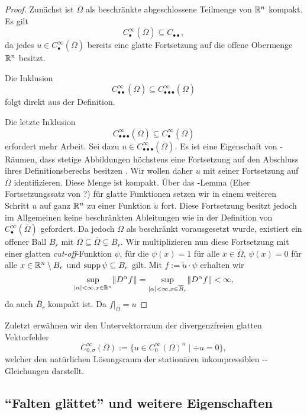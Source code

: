 \begin{proof}
  Zunächst ist $\overline\Omega$ als beschränkte abgeschlossene Teilmenge von $\mathbb{R}^n$ kompakt.
  Es gilt $$C^\infty_\bullet(\overline\Omega) \subseteq C_{\bullet\bullet},$$ da jedes $u\in C^\infty_\bullet(\overline\Omega)$ bereits eine glatte Fortsetzung auf die offene Obermenge $\mathbb{R}^n$ besitzt.

  Die Inklusion $$C^\infty_{\bullet\bullet}(\overline\Omega) \subseteq C^\infty_{\bullet\bullet\bullet}(\overline\Omega)$$ folgt direkt aus der Definition.
  
  Die letzte Inklusion $$C^\infty_{\bullet\bullet\bullet}(\overline\Omega) \subseteq C^\infty_{\bullet}(\overline\Omega)$$ erfordert mehr Arbeit.
  Sei dazu $u \in C^\infty_{\bullet\bullet\bullet}(\overline\Omega)$.
  Es ist eine Eigenschaft von \hausdorff\hyp{}Räumen, dass stetige Abbildungen höchstens eine Fortsetzung auf den Abschluss ihres Definitionsberechs besitzen \cite[S.112, Lemma 4.2.4]{bartsch2015topologie}.
  Wir wollen daher $u$ mit seiner Fortsetzung auf $\overline\Omega$ identifizieren.
  Diese Menge ist kompakt.
  Über das \urysohn\hyp{}Lemma (Eher Fortsetzungssatz von \steiner?) für glatte Funktionen \cite{rochskriptehernicht} setzen wir in einem weiteren Schritt $u$ auf ganz $\mathbb{R}^n$ zu einer Funktion $\tilde u$ fort.
  Diese Fortsetzung besitzt jedoch im Allgemeinen keine beschränkten Ableitungen wie in der Definition von $C^\infty_{\bullet}(\overline\Omega)$ gefordert.
  Da jedoch $\Omega$ als beschränkt vorausgesetzt wurde, existiert ein offener Ball $B_r$ mit $\Omega \subseteq \overline\Omega \subsetneq B_r$. 
  Wir multiplizieren nun diese Fortsetzung mit einer glatten \emph{cut-off}\hyp{}Funktion $\psi$, für die
  $\psi(x) = 1$ für alle $x \in \overline\Omega$, $\psi(x) = 0$ für alle $x \in \mathbb{R}^n \setminus B_r$ und $\operatorname{supp} \psi \subseteq B_r$ gilt.
  Mit $f := \tilde u \cdot \psi$ erhalten wir
  $$
  \sup_{|\alpha| < \infty, x \in \mathbb{R}^n}\lVert  D^\alpha f \rVert
   = \sup_{|\alpha| < \infty, x \in \overline B_r}\lVert  D^\alpha f \rVert
   < \infty,
  $$
  da auch $\overline B_r$ kompakt ist.
  Da $f|_{\overline\Omega} = u$
\end{proof}

Zuletzt erwähnen wir den Untervektorraum der divergenzfreien glatten Vektorfelder
$$
C_{0,\sigma}^\infty(\Omega) := \{u \in C_0^\infty(\Omega)^n \mid \div u = 0\},
$$
 welcher den natürlichen Lösungsraum der stationären inkompressiblen \navier\hyp{}\stokes\hyp{}Gleichungen darstellt.

\subsection{``Falten glättet'' und weitere Eigenschaften}
\label{subsec:mollification}

